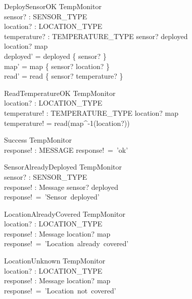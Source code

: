 \documentclass[12pt]{article}
\begin{document}
\begin{schema}{DeploySensorOK}
\Delta TempMonitor\\
sensor? : SENSOR\_TYPE\\
location? : LOCATION\_TYPE\\
temperature? : TEMPERATURE\_TYPE
\where
sensor? \notin deployed\\
location? \notin \ran map\\
deployed' = deployed \cup \{ sensor? \}\\
map' = map \cup \{ sensor? \mapsto location? \}\\
read' = read \cup \{ sensor? \mapsto temperature? \}
\end{schema}


\begin{schema}{ReadTemperatureOK}
\Xi TempMonitor\\
location? : LOCATION\_TYPE\\
temperature! : TEMPERATURE\_TYPE
\where
location? \in \ran map\\
temperature! = read(map^{-1}(location?))\\
\end{schema}

\begin{schema}{Success}
\Xi TempMonitor\\
response! : MESSAGE
\where
response!~=~'ok'\\
\end{schema}



\begin{schema}{SensorAlreadyDeployed}
\Xi TempMonitor\\
sensor? : SENSOR\_TYPE\\
response! : Message
\ST
sensor? \in deployed\\
response!~=~'Sensor~deployed'
\end{schema}


\begin{schema}{LocationAlreadyCovered}
\Xi TempMonitor\\
location? : LOCATION\_TYPE\\
response! : Message
\ST
location? \in \ran map\\
response!~=~'Location~already~covered'
\end{schema}


\begin{schema}{LocationUnknown}
\Xi TempMonitor\\
location? : LOCATION\_TYPE\\
response! : Message
\ST
location? \notin \ran map\\
response!~=~'Location~not~covered'
\end{schema}
\end{document}
